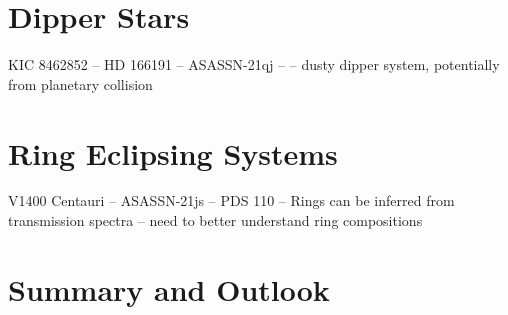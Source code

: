 \documentclass[%
 reprint,
 amsmath,amssymb,
 aps,
rmp,
floatfix,
]{revtex4-2}
\def\\{}%
\begin{document}
\section{Dipper Stars} \label{sec:dippers}
KIC 8462852 -- \citep{Boyajian2016MNRAS} \\
HD 166191 -- \citep{Su2022ApJ} \\
ASASSN-21qj -- \citep{Marshall2023ApJ} \\
\citep{Ansdell2016ApJ}\\
\citep{Melis2021ApJ} -- dusty dipper system, potentially from planetary collision


\section{Ring Eclipsing Systems} \label{sec:ring-eclipse}
V1400 Centauri -- \citep{Mamajek2012AJ, van-Werkhoven2014MNRAS, Kenworthy2015ApJ} \\
ASASSN-21js -- \citep{Pramono2024A&A} \\
PDS 110 -- \citep{Osborn2017MNRAS} \\
Rings can be inferred from transmission spectra \citep{Ohno2022ApJ} -- need to better understand ring compositions





\section{Summary and Outlook}
\end{document}
